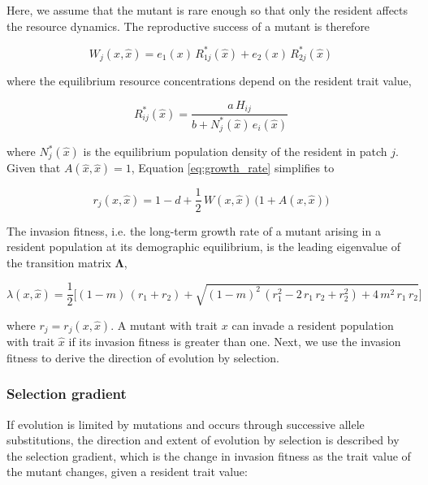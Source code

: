 Here, we assume that the mutant is rare enough so that only the resident affects the resource dynamics. The reproductive success of a mutant is therefore

\begin{equation}
    W_j(x, \hat x) = e_1(x)\,R_{1j}^*(\hat x) + e_2(x)\,R_{2j}^*(\hat x)
\end{equation}

where the equilibrium resource concentrations depend on the resident trait value,

\begin{equation}
    R_{ij}^*(\hat x) = \frac{a\,H_{ij}}{b + N_j^*(\hat x) \, e_i(\hat x)}
\end{equation}

where $N_j^*(\hat x)$ is the equilibrium population density of the resident in patch $j$.\\

Given that $A(\hat{x}, \hat{x}) = 1$, Equation \ref{eq:growth_rate} simplifies to

\begin{equation}
    r_j(x, \hat{x}) = 1 - d + \frac{1}{2} \, W(x, \hat{x}) \, \big(1 + A(x, \hat{x})\big)
\end{equation}

The invasion fitness, i.e. the long-term growth rate of a mutant arising in a resident population at its demographic equilibrium, is the leading eigenvalue of the transition matrix $\pmb{\Lambda}$,

\begin{equation}
    \lambda(x, \hat{x}) = \frac{1}{2} \bigg[(1-m) \, (r_1 + r_2) + \sqrt{(1-m)^2 \, (r_1^2 - 2 \, r_1 \, r_2 + r_2^2) + 4 \, m^2 \, r_1 \, r_2} \bigg]
    \label{eq:invasion_fitness}
\end{equation}

where $r_j = r_j(x, \hat x)$. A mutant with trait $x$ can invade a resident population with trait $\hat x$ if its invasion fitness is greater than one. Next, we use the invasion fitness to derive the direction of evolution by selection.

\subsubsection*{Selection gradient}

If evolution is limited by mutations and occurs through successive allele substitutions, the direction and extent of evolution by selection is described by the selection gradient, which is the change in invasion fitness as the trait value of the mutant changes, given a resident trait value:

